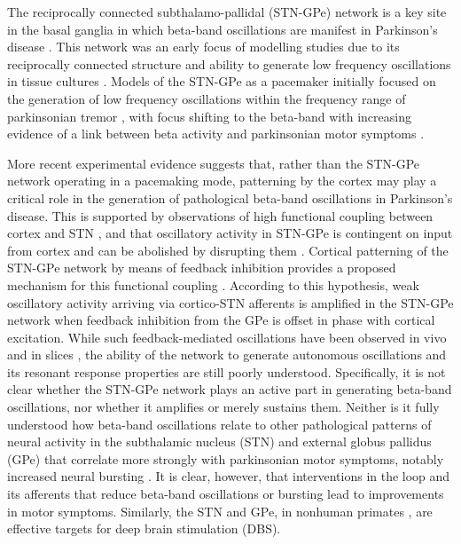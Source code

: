 %
The reciprocally connected subthalamo-pallidal (STN-GPe) network is a key site in the basal ganglia in which beta-band oscillations are manifest in Parkinson's disease \cite{mallet_parkinsonian_2008,mallet_disrupted_2008}. This network was an early focus of modelling studies due to its reciprocally connected structure and ability to generate low frequency oscillations in tissue cultures \cite{plenz_basal_1999}. Models of the STN-GPe as a pacemaker initially focused on the generation of low frequency oscillations within the frequency range of parkinsonian tremor \cite{gillies_subthalamic-pallidal_2002,terman_activity_2002}, with focus shifting to the beta-band with increasing evidence of a link between beta activity and parkinsonian motor symptoms \cite{holgado_conditions_2010,pavlides_improved_2012}.

%
More recent experimental evidence suggests that, rather than the STN-GPe network operating in a pacemaking mode, patterning by the cortex may play a critical role in the generation of pathological beta-band oscillations in Parkinson's disease. This is supported by observations of high functional coupling between cortex and STN \cite{mallet_parkinsonian_2008,magill_brain_2004,moran_alterations_2011,sharott_dopamine_2005,litvak_resting_2011}, and that oscillatory activity in STN-GPe is contingent on input from cortex and can be abolished by disrupting them \cite{drouot_functional_2004,magill_dopamine_2001,tachibana_subthalamo-pallidal_2011}.
Cortical patterning of the STN-GPe network by means of feedback inhibition provides a proposed mechanism for this functional coupling \cite{baufreton_enhancement_2005,bevan_cellular_2006,tachibana_subthalamo-pallidal_2011,mallet_parkinsonian_2008,mallet_dichotomous_2012}. According to this hypothesis, weak oscillatory activity arriving via cortico-STN afferents is amplified in the STN-GPe network when feedback inhibition from the GPe is offset in phase with cortical excitation. While such feedback-mediated oscillations have been observed in vivo \cite{paz_rhythmic_2005} and in slices \cite{baufreton_enhancement_2005}, the ability of the network to generate autonomous oscillations and its resonant response properties are still poorly understood.
%
%
%
%
%
%
Specifically, it is not clear whether the STN-GPe network plays an active part in generating beta-band oscillations, nor whether it amplifies or merely sustains them. Neither is it fully understood how beta-band oscillations relate to other pathological patterns of neural activity in the subthalamic nucleus (STN) and external globus pallidus (GPe) that correlate more strongly with parkinsonian motor symptoms, notably increased neural bursting \cite{sanders_parkinsonism-related_2013,sharott_activity_2014}. It is clear, however, that interventions in the loop and its afferents that reduce beta-band oscillations \cite{tachibana_subthalamo-pallidal_2011} or bursting \cite{gradinaru_optical_2009,sanders_optogenetic_2016,pan_neuronal_2016} lead to improvements in motor symptoms. Similarly, the STN \cite{benabid_deep_2009} and GPe, in nonhuman primates \cite{vitek_external_2012}, are effective targets for deep brain stimulation (DBS).
%
%
%
%
%
%

